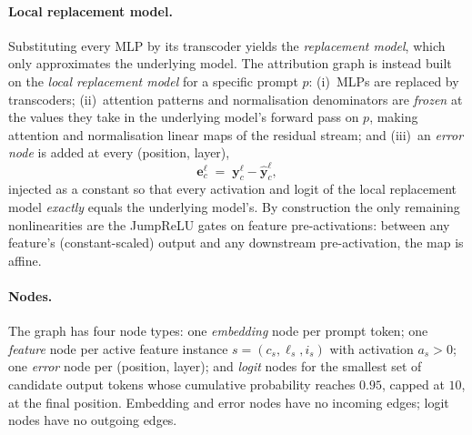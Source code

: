 \documentclass[11pt,a4paper]{article}
\begin{document}
\paragraph{Local replacement model.}
Substituting every MLP by its transcoder yields the \emph{replacement model}, which
only approximates the underlying model. The attribution graph is instead built on the
\emph{local replacement model} for a specific prompt $p$: (i)~MLPs are replaced by
transcoders; (ii)~attention patterns and normalisation denominators are \emph{frozen}
at the values they take in the underlying model's forward pass on $p$, making
attention and normalisation linear maps of the residual stream; and (iii)~an
\emph{error node} is added at every (position, layer),
\begin{equation}
\bm{e}^{\ell}_{c} \;=\; \bm{y}^{\ell}_{c} - \hat{\bm{y}}^{\ell}_{c},
\end{equation}
injected as a constant so that every activation and logit of the local replacement
model \emph{exactly} equals the underlying model's. By construction the only remaining
nonlinearities are the JumpReLU gates on feature pre-activations: between any feature's
(constant-scaled) output and any downstream pre-activation, the map is affine.

\paragraph{Nodes.}
The graph has four node types: one \emph{embedding} node per prompt token; one
\emph{feature} node per active feature instance $s=(c_s,\ell_s,i_s)$ with activation
$a_s>0$; one \emph{error} node per (position, layer); and \emph{logit} nodes for the
smallest set of candidate output tokens whose cumulative probability reaches $0.95$,
capped at $10$, at the final position. Embedding and error nodes have no incoming
edges; logit nodes have no outgoing edges.
\end{document}
